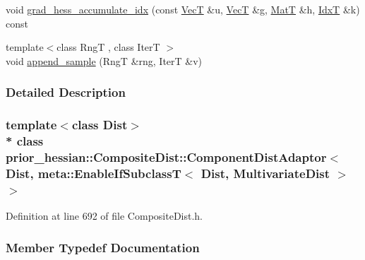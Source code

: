 \begin{DoxyCompactItemize}
\item 
void \hyperlink{classprior__hessian_1_1CompositeDist_1_1ComponentDistAdaptor_3_01Dist_00_01meta_1_1EnableIfSubcld67d34d533dbae21b9dad35557546eec_ac5283bdcf85d28d389d5a4270fb76f10}{grad\+\_\+hess\+\_\+accumulate\+\_\+idx} (const \hyperlink{namespaceprior__hessian_a0b42fc70dec525d83fb2ac155d9ab974}{VecT} \&u, \hyperlink{namespaceprior__hessian_a0b42fc70dec525d83fb2ac155d9ab974}{VecT} \&g, \hyperlink{namespaceprior__hessian_aab58331a34ed4ef22b6022564fe74be3}{MatT} \&h, \hyperlink{namespaceprior__hessian_aa8d589f74e88bfa3b5750118acd1ab78}{IdxT} \&k) const 
\item 
{\footnotesize template$<$class RngT , class IterT $>$ }\\void \hyperlink{classprior__hessian_1_1CompositeDist_1_1ComponentDistAdaptor_3_01Dist_00_01meta_1_1EnableIfSubcld67d34d533dbae21b9dad35557546eec_a80260d9be429ccd533205b7ac25112a6}{append\+\_\+sample} (RngT \&rng, IterT \&v)
\end{DoxyCompactItemize}


\subsubsection{Detailed Description}
\subsubsection*{template$<$class Dist$>$\\*
class prior\+\_\+hessian\+::\+Composite\+Dist\+::\+Component\+Dist\+Adaptor$<$ Dist, meta\+::\+Enable\+If\+Subclass\+T$<$ Dist, Multivariate\+Dist $>$ $>$}



Definition at line 692 of file Composite\+Dist.\+h.



\subsubsection{Member Typedef Documentation}
